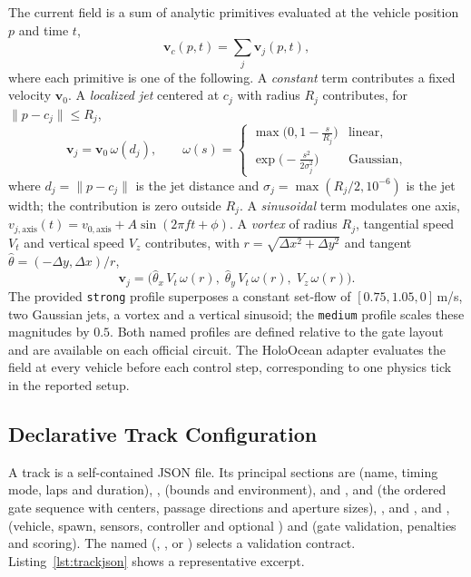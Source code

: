 The current field is a sum of analytic primitives evaluated at the vehicle position $p$ and time $t$,
\begin{equation}
\label{eq:current_sum}
\mathbf{v}_c(p,t)=\sum_{j} \mathbf{v}_j(p,t),
\end{equation}
where each primitive is one of the following. A \emph{constant} term contributes a fixed velocity $\mathbf{v}_0$. A \emph{localized jet} centered at $c_j$ with radius $R_j$ contributes, for $\lVert p-c_j\rVert\le R_j$,
\begin{equation}
\label{eq:jet}
\mathbf{v}_j=\mathbf{v}_0\, \omega(d_j), \qquad
\omega(s)=\begin{cases} \max\!\big(0,1-\tfrac{s}{R_j}\big) & \text{linear,}\\[2pt] \exp\!\big(-\tfrac{s^2}{2\sigma_j^2}\big) & \text{Gaussian,} \end{cases}
\end{equation}
where $d_j=\lVert p-c_j\rVert$ is the jet distance and $\sigma_j=\max(R_j/2,10^{-6})$ is the jet width; the contribution is zero outside $R_j$. A \emph{sinusoidal} term modulates one axis, $v_{j,\mathrm{axis}}(t)=v_{0,\mathrm{axis}}+A\sin(2\pi f t+\phi)$. A \emph{vortex} of radius $R_j$, tangential speed $V_t$ and vertical speed $V_z$ contributes, with $r=\sqrt{\Delta x^2+\Delta y^2}$ and tangent $\hat{\theta}=(-\Delta y,\Delta x)/r$,
\begin{equation}
\label{eq:vortex}
\mathbf{v}_j=\big(\hat{\theta}_x\,V_t\,\omega(r),\;\hat{\theta}_y\,V_t\,\omega(r),\;V_z\,\omega(r)\big).
\end{equation}
The provided \texttt{strong} profile superposes a constant set-flow of $[0.75,1.05,0]$\,m/s, two Gaussian jets, a vortex and a vertical sinusoid; the \texttt{medium} profile scales these magnitudes by $0.5$. Both named profiles are defined relative to the gate layout and are available on each official circuit. The HoloOcean adapter evaluates the field at every vehicle before each control step, corresponding to one physics tick in the reported setup.

\subsection{Declarative Track Configuration}

A track is a self-contained JSON file. Its principal sections are  (name, timing mode, laps and duration), ,  (bounds and environment),  and ,  and  (the ordered gate sequence with centers, passage directions and aperture sizes), ,  and ,  and ,  (vehicle, spawn, sensors, controller and optional ) and  (gate validation, penalties and scoring). The named  (, ,  or ) selects a validation contract. Listing~\ref{lst:trackjson} shows a representative excerpt.

